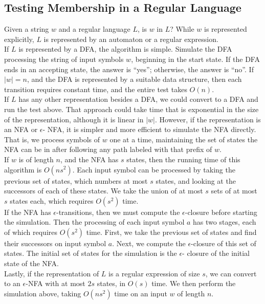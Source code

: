 \documentclass[]{article}
\begin{document}
    \subsection*{Testing Membership in a Regular Language}
      Given a string $w$ and a regular language $L$, is $w$ in $L$? While $w$ is
      represented explicitly, $L$ is represented by an automaton or a regular
      expression. \\
      \indent If $L$ is represented by a DFA, the algorithm is simple. Simulate
      the DFA processing the string of input symbols $w$, beginning in the start
      state. If the DFA ends in an accepting state, the answer is ``yes'';
      otherwise, the answer is ``no''. If $|w| = n$, and the DFA is represented
      by a suitable data structure, then each transition requires constant time,
      and the entire test takes $O(n)$. \\
      \indent If $L$ has any other representation besides a DFA, we could
      convert to a DFA and run the test above. That approach could take time
      that is exponential in the size of the representation, although it is
      linear in $|w|$. However, if the representation is an NFA or $\epsilon$-
      NFA, it is simpler and more efficient to simulate the NFA directly. That
      is, we process symbols of $w$ one at a time, maintaining the set of states
      the NFA can be in after following any path labeled with that prefix of $w
      $. \\
      \indent If $w$ is of length $n$, and the NFA has $s$ states, then the
      running time of this algorithm is $O(ns^2)$. Each input symbol can be
      processed by taking the previous set of states, which numbers at most $s$
      states, and looking at the successors of each of these states. We take the
      union of at most $s$ sets of at most $s$ states each, which requires
      $O(s^2)$ time. \\
      \indent If the NFA has $\epsilon$-transitions, then we must compute the
      $\epsilon$-closure before starting the simulation. Then the processing of
      each input symbol $a$ has two stages, each of which requires $O(s^2)$
      time. First, we take the previous set of states and find their successors
      on input symbol $a$. Next, we compute the $\epsilon$-closure of this set
      of states. The initial set of states for the simulation is the $\epsilon$-
      closure of the initial state of the NFA. \\
      \indent Lastly, if the representation of $L$ is a regular expression of
      size $s$, we can convert to an $\epsilon$-NFA with at most $2s$ states, in
      $O(s)$ time. We then perform the simulation above, taking $O(ns^2)$ time
      on an input $w$ of length $n$.
\end{document}
